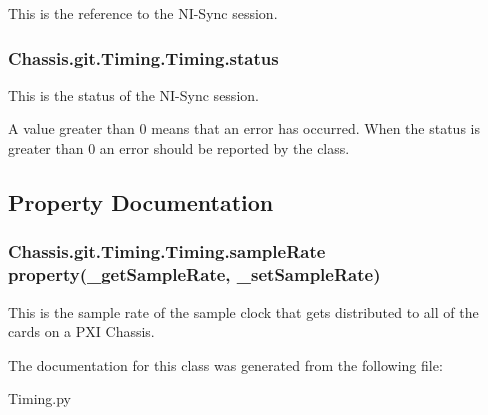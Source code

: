 This is the reference to the N\-I-\/\-Sync session. 

\hypertarget{class_chassis_8git_1_1_timing_1_1_timing_aa436c65a85fddf23300de2af3e2f01f6}{
\subsubsection[{status}]{\setlength{\rightskip}{0pt plus 5cm}Chassis.\-git.\-Timing.\-Timing.\-status}}\label{class_chassis_8git_1_1_timing_1_1_timing_aa436c65a85fddf23300de2af3e2f01f6}


This is the status of the N\-I-\/\-Sync session. 

A value greater than 0 means that an error has occurred. When the status is greater than 0 an error should be reported by the class. 

\subsection{Property Documentation}
\hypertarget{class_chassis_8git_1_1_timing_1_1_timing_a45aa2c7a4bbb7155298c1bf737608863}{
\subsubsection[{sample\-Rate}]{\setlength{\rightskip}{0pt plus 5cm}Chassis.\-git.\-Timing.\-Timing.\-sample\-Rate property(\-\_\-get\-Sample\-Rate, \-\_\-set\-Sample\-Rate)\hspace{0.3cm}{\ttfamily [static]}}}\label{class_chassis_8git_1_1_timing_1_1_timing_a45aa2c7a4bbb7155298c1bf737608863}


This is the sample rate of the sample clock that gets distributed to all of the cards on a P\-X\-I Chassis. 



The documentation for this class was generated from the following file\-:\begin{DoxyCompactItemize}
\item 
Timing.\-py\end{DoxyCompactItemize}
